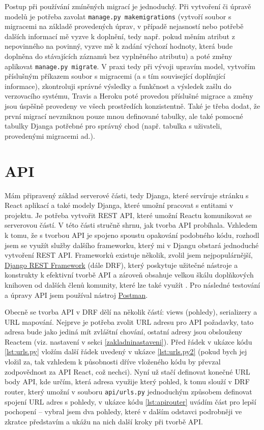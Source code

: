    Postup při používání zmíněných migrací je jednoduchý. Při vytvoření či úpravě modelů je potřeba zavolat \verb|manage.py makemigrations| (vytvoří soubor s migracemi na základě provedených úprav, v případě nejasností nebo potřebě dalších informací mě vyzve k doplnění, tedy např. pokud měním atribut z nepovinného na povinný, vyzve mě k zadání výchozí hodnoty, která bude doplněna do stávajících záznamů bez vyplněného atributu) a poté změny aplikovat \verb|manage.py migrate|. V praxi tedy při vývoji upravím model, vytvořím příslušným příkazem soubor s migracemi (a s tím související doplňující informace), zkontroluji správné výsledky a funkčnost a výsledek zašlu do verzovacího systému, Travis a Heroku poté provedou příslušné migrace a změny jsou úspěšně provedeny ve všech prostředích konzistentně. Také je třeba dodat, že první migrací nevzniknou pouze mnou definované tabulky, ale také pomocné tabulky Djanga potřebné pro správný chod (např. tabulka s uživateli, provedenými migracemi ad.).
    
    \section{API}\label{sec:api}
    Mám připravený základ serverové části, tedy Djanga, které servíruje stránku s React aplikací a také modely Djanga, které umožní pracovat s entitami v projektu. Je potřeba vytvořit REST API, které umožní Reactu komunikovat se serverovou částí. V této části stručně shrnu, jak tvorba API probíhala. Vzhledem k tomu, že s tvorbou API je spojeno spoustu opakování podobného kódu, rozhodl jsem se využít služby dalšího frameworku, který mi v Djangu obstará jednoduché vytvoření REST API. Frameworků existuje několik, zvolil jsem nejpopulárnější, \href{http://www.django-rest-framework.org/}{Django REST Framework} (dále DRF), který poskytuje užitečné nástroje a konstrukty k efektivní tvorbě API a zároveň obsahuje velkou škálu doplňkových knihoven od dalších členů komunity, které lze také využít \cite{drf2}. Pro následné testování a úpravy API jsem používal nástroj \href{https://www.getpostman.com/}{Postman}.
    
    Obecně se tvorba API v DRF dělí na několik částí: views (pohledy), serializery a URL mapování. Nejprve je potřeba zvolit URL adresu pro API požadavky, tato adresa bude jako jediná mít zvláštní chování, ostatní adresy jsou obslouženy Reactem (viz. nastavení v sekci \ref{zakladninastaveni}). Před řádek v ukázce kódu \ref{lst:urls.py} vložím další řádek uvedený v ukázce \ref{lst:urls.py2} (pokud bych jej vložil za, tak vzhledem k působnosti dříve vloženého kódu by převzal zodpovědnost za API React, což nechci). Nyní už stačí definovat konečné URL body API, kde určím, která adresa využije který pohled, k tomu slouží v DRF router, který umožní v souboru \verb|api/urls.py| jednoduchým způsobem definovat spojení URL adres s pohledy, v ukázce kódu \ref{lst:apirouter} uvádím část pro lepší pochopení -- vybral jsem dva pohledy, které v dalším odstavci podrobněji ve zkratce představím a ukážu na nich další kroky při tvorbě API.
    
